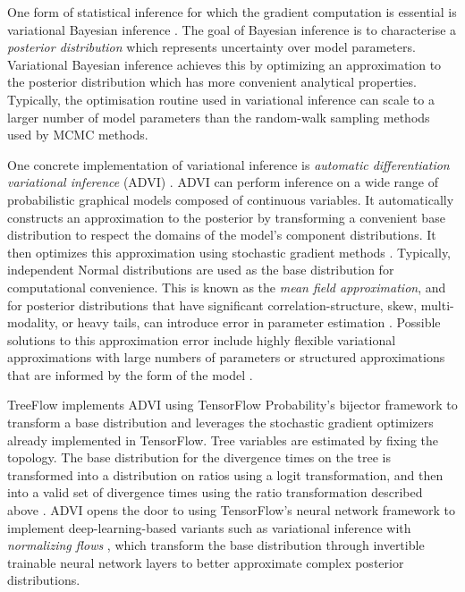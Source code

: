One form of statistical inference for which the gradient computation is essential is variational Bayesian inference \cite{jordan1999introduction}. The goal of Bayesian inference is to characterise a \textit{posterior distribution} which represents uncertainty over model parameters. Variational Bayesian inference achieves this by optimizing an approximation to the posterior distribution which has more convenient analytical properties. Typically, the optimisation routine used in variational inference can scale to a larger number of model parameters than the random-walk sampling methods used by MCMC methods.

One concrete implementation of variational inference is \textit{automatic differentiation variational inference} (ADVI) \cite{kucukelbir2017automatic}. ADVI can perform inference on a wide range of probabilistic graphical models composed of continuous variables. It automatically constructs an approximation to the posterior by transforming a convenient base distribution to respect the domains of the model's component distributions. It then optimizes this approximation using stochastic gradient methods \cite{robbins1951stochastic, bottou2010large}. Typically, independent Normal distributions are used as the base distribution for computational convenience. This is known as the \textit{mean field approximation}, and for posterior distributions that have significant correlation-structure, skew, multi-modality, or heavy tails, can introduce error in parameter estimation \cite{blei2017variational}. Possible solutions to this approximation error include highly flexible variational approximations with large numbers of parameters \cite{rezende2015variational} or structured approximations that are informed by the form of the model \cite{ambrogioni2021automatic}.

TreeFlow implements ADVI using TensorFlow Probability's bijector framework to transform a base distribution and leverages the stochastic gradient optimizers already implemented in TensorFlow. Tree variables are estimated by fixing the topology. The base distribution for the divergence times on the tree is transformed into a distribution on ratios using a logit transformation, and then into a valid set of divergence times using the ratio transformation described above \cite{yang2007paml}. ADVI opens the door to using TensorFlow's neural network framework to implement deep-learning-based variants such as variational inference with \textit{normalizing flows} \cite{rezende2015variational}, which transform the base distribution through invertible trainable neural network layers to better approximate complex posterior distributions.

